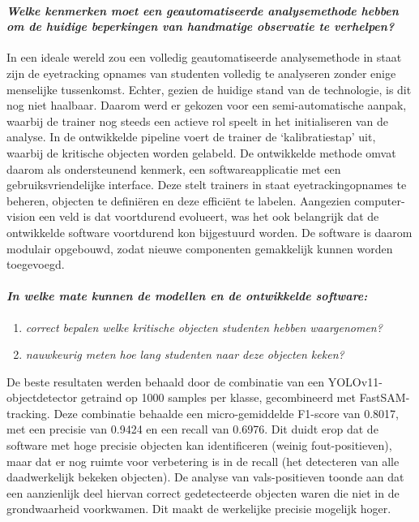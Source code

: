 \paragraph{\textit{Welke kenmerken moet een geautomatiseerde analysemethode hebben om de huidige beperkingen van handmatige observatie te verhelpen?}}
In een ideale wereld zou een volledig geautomatiseerde analysemethode in staat zijn  
de eyetracking opnames van studenten volledig te analyseren zonder enige menselijke tussenkomst.
Echter, gezien de huidige stand van de technologie, is dit nog niet haalbaar.
Daarom werd er gekozen voor een semi-automatische aanpak, waarbij de trainer nog steeds een actieve rol speelt in het initialiseren van de analyse.
In de ontwikkelde pipeline voert de trainer de `kalibratiestap' uit, waarbij de kritische objecten worden gelabeld. 
De ontwikkelde methode omvat daarom als ondersteunend kenmerk, een softwareapplicatie met een gebruiksvriendelijke interface. 
Deze stelt trainers in staat eyetrackingopnames te beheren, objecten te definiëren en deze efficiënt te labelen.
Aangezien computer-vision een veld is dat voortdurend evolueert, was het ook belangrijk dat de ontwikkelde software voortdurend kon bijgestuurd worden.
De software is daarom modulair opgebouwd, zodat nieuwe componenten gemakkelijk kunnen worden toegevoegd.
    
\paragraph{\textit{In welke mate kunnen de modellen en de ontwikkelde software:}}
\begin{enumerate}
    \item \textit{correct bepalen welke kritische objecten studenten hebben waargenomen?}
    \item \textit{nauwkeurig meten hoe lang studenten naar deze objecten keken?}
\end{enumerate}
De beste resultaten werden behaald door de combinatie van een YOLOv11-objectdetector getraind op 1000 samples per klasse, gecombineerd met FastSAM-tracking.
Deze combinatie behaalde een micro-gemiddelde F1-score van 0.8017, met een precisie van 0.9424 en een recall van 0.6976.
Dit duidt erop dat de software met hoge precisie objecten kan identificeren (weinig fout-positieven), 
maar dat er nog ruimte voor verbetering is in de recall (het detecteren van alle daadwerkelijk bekeken objecten). 
De analyse van vals-positieven toonde aan dat een aanzienlijk deel hiervan correct gedetecteerde objecten waren 
die niet in de grondwaarheid voorkwamen. Dit maakt de werkelijke precisie mogelijk hoger.


